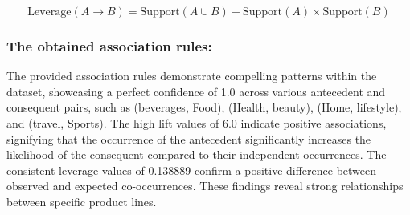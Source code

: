 \begin{equation}
\text{Leverage}(A \rightarrow B) = \text{Support}(A \cup B) - \text{Support}(A) \times \text{Support}(B)
\end{equation}

\subsubsection{The obtained association rules:}

\begin{table}[htbp]
    \centering
    \label{tab:pink_colors_fit}
\end{table}
The provided association rules demonstrate compelling patterns within the dataset, showcasing a perfect confidence of 1.0 across various antecedent and consequent pairs, such as (beverages, Food), (Health, beauty), (Home, lifestyle), and (travel, Sports). The high lift values of 6.0 indicate positive associations, signifying that the occurrence of the antecedent significantly increases the likelihood of the consequent compared to their independent occurrences. The consistent leverage values of 0.138889 confirm a positive difference between observed and expected co-occurrences. These findings reveal strong relationships between specific product lines.



